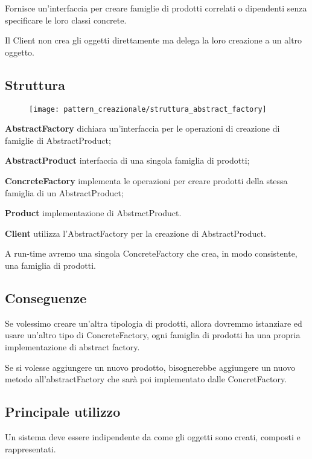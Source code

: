 Fornisce un’interfaccia per creare famiglie di prodotti correlati o dipendenti senza specificare le loro classi concrete.

Il Client non crea gli oggetti direttamente ma delega la loro creazione a un altro oggetto.

\subsection{Struttura}

\begin{figure}[H]
    \centering
    \texttt{[image: pattern\_creazionale/struttura\_abstract\_factory]}
\end{figure}

\textbf{AbstractFactory} dichiara un’interfaccia per le operazioni di creazione di famiglie di AbstractProduct;

\textbf{AbstractProduct} interfaccia di una singola famiglia di prodotti;

\textbf{ConcreteFactory} implementa le operazioni per creare prodotti della stessa famiglia di un AbstractProduct;

\textbf{Product} implementazione di AbstractProduct.

\textbf{Client} utilizza l'AbstractFactory per la creazione di AbstractProduct.
\medskip

A run-time avremo una singola ConcreteFactory che crea, in modo consistente, una famiglia di prodotti.

\subsection{Conseguenze}

Se volessimo creare un'altra tipologia di prodotti, allora dovremmo istanziare ed usare un'altro tipo di ConcreteFactory, ogni famiglia di prodotti ha una propria 
implementazione di abstract factory.

Se si volesse aggiungere un nuovo prodotto, bisognerebbe aggiungere un nuovo metodo all'abstractFactory che sarà poi implementato dalle ConcretFactory.

\subsection{Principale utilizzo}

Un sistema deve essere indipendente da come gli oggetti sono creati, composti e rappresentati.

